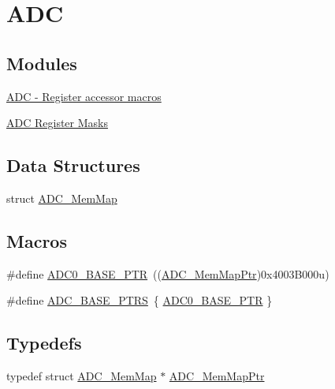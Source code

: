 \hypertarget{group___a_d_c___peripheral}{}\section{A\+DC}
\label{group___a_d_c___peripheral}
\subsection*{Modules}
\begin{DoxyCompactItemize}
\item 
\hyperlink{group___a_d_c___register___accessor___macros}{A\+D\+C -\/ Register accessor macros}
\item 
\hyperlink{group___a_d_c___register___masks}{A\+D\+C Register Masks}
\end{DoxyCompactItemize}
\subsection*{Data Structures}
\begin{DoxyCompactItemize}
\item 
struct \hyperlink{struct_a_d_c___mem_map}{A\+D\+C\+\_\+\+Mem\+Map}
\end{DoxyCompactItemize}
\subsection*{Macros}
\begin{DoxyCompactItemize}
\item 
\#define \hyperlink{group___a_d_c___peripheral_ga6cec2f227a3a37a9fccaa830740f1f5e}{A\+D\+C0\+\_\+\+B\+A\+S\+E\+\_\+\+P\+TR}~((\hyperlink{group___a_d_c___peripheral_ga1673c677bf7c0ca339c8563e06de75fa}{A\+D\+C\+\_\+\+Mem\+Map\+Ptr})0x4003\+B000u)
\item 
\#define \hyperlink{group___a_d_c___peripheral_gaaa8175a3a2f4efaceeed5bd26c0b2d3f}{A\+D\+C\+\_\+\+B\+A\+S\+E\+\_\+\+P\+T\+RS}~\{ \hyperlink{group___a_d_c___peripheral_ga6cec2f227a3a37a9fccaa830740f1f5e}{A\+D\+C0\+\_\+\+B\+A\+S\+E\+\_\+\+P\+TR} \}
\end{DoxyCompactItemize}
\subsection*{Typedefs}
\begin{DoxyCompactItemize}
\item 
typedef struct \hyperlink{struct_a_d_c___mem_map}{A\+D\+C\+\_\+\+Mem\+Map} $\ast$ \hyperlink{group___a_d_c___peripheral_ga1673c677bf7c0ca339c8563e06de75fa}{A\+D\+C\+\_\+\+Mem\+Map\+Ptr}
\end{DoxyCompactItemize}


